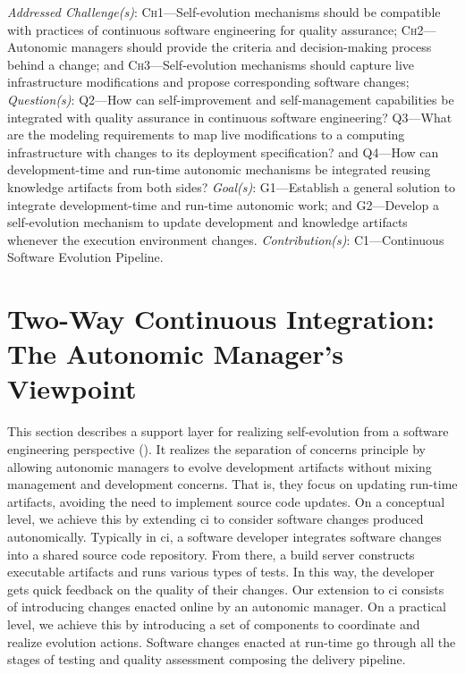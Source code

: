 \begin{InfoBox}
	\emph{Addressed Challenge(s)}: \textsc{Ch}1---Self-evolution mechanisms should be compatible with practices of continuous software engineering for quality assurance; \textsc{Ch}2---Autonomic managers should provide the criteria and decision-making process behind a change; and \textsc{Ch}3---Self-evolution mechanisms should capture live infrastructure modifications and propose corresponding software changes; 
	\emph{Question(s)}: \textsc{Q}2---How can self-improvement and self-management capabilities be integrated with quality assurance in continuous software engineering? \textsc{Q}3---What are the modeling requirements to map live modifications to a computing infrastructure with changes to its deployment specification? and \textsc{Q}4---How can development-time and run-time autonomic mechanisms be integrated reusing knowledge artifacts from both sides? 
	\emph{Goal(s)}: \textsc{G}1---Establish a general solution to integrate development-time and run-time autonomic work; and \textsc{G}2---Develop a self-evolution mechanism to update development and knowledge artifacts whenever the execution environment changes.
	\emph{Contribution(s)}: \textsc{C}1---Continuous Software Evolution Pipeline.
\end{InfoBox}

\section{Two-Way Continuous Integration: The Autonomic Manager's Viewpoint}
\label{sect:delivery-platform--self-evolution-through-two-way-ci}

This section describes a support layer for realizing self-evolution from a software engineering perspective (). It realizes the separation of concerns principle by allowing autonomic managers to evolve development artifacts without mixing management and development concerns. That is, they focus on updating run-time artifacts, avoiding the need to implement source code updates. On a conceptual level, we achieve this by extending \gls{ci} to consider software changes produced autonomically. Typically in \gls{ci}, a software developer integrates software changes into a shared source code repository. From there, a build server constructs executable artifacts and runs various types of tests. In this way, the developer gets quick feedback on the quality of their changes. Our extension to \gls{ci} consists of introducing changes enacted online by an autonomic manager. On a practical level, we achieve this by introducing a set of components to coordinate and realize evolution actions. Software changes enacted at run-time go through all the stages of testing and quality assessment composing the delivery pipeline.

